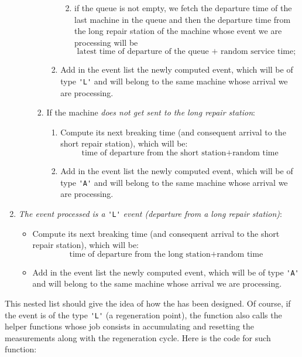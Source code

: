 \documentclass[12pt]{article}
\begin{document}
\begin{enumerate}[\circnum]
\begin{itemize}
\begin{enumerate}
\begin{enumerate}
\begin{enumerate}
\begin{equation*}
					\end{equation*}
					\item if the queue is not empty, we fetch the departure time of the last machine in the queue and then the departure time from the long repair station of the machine whose event we are processing will be
					\begin{equation*}
						\text{latest time of departure of the queue + random service time};
					\end{equation*}
				\end{enumerate}
				\item Add in the event list the newly computed event, which will be of type \verb*|'L'| and will belong to the same machine whose arrival we are processing.
			\end{enumerate}
			\item If the machine \textit{does not get sent to the long repair station}:
			\begin{enumerate}
				\item Compute its next breaking time (and consequent arrival to the short repair station), which will be:
				\begin{equation*}
					\text{time of departure from the short station+random time}
				\end{equation*}
				\item Add in the event list the newly computed event, which will be of type \verb*|'A'| and will belong to the same machine whose arrival we are processing.
			\end{enumerate}
		\end{enumerate}
	\end{itemize}
	\item \emph{The event processed is a }\verb*|'L'|\emph{ event (departure from a long repair station)}:
	\begin{itemize}
		\item Compute its next breaking time (and consequent arrival to the short repair station), which will be:
		\begin{equation*}
			\text{time of departure from the long station+random time}
		\end{equation*}
		\item Add in the event list the newly computed event, which will be of type \verb*|'A'| and will belong to the same machine whose arrival we are processing.
	\end{itemize}
\end{enumerate}
This nested list should give the idea of how the  has been designed. Of course, if the event is of the type \verb*|'L'| (a regeneration point), the function also calls the helper functions whose job consists in accumulating and resetting the measurements along with the regeneration cycle. Here is the code for such function:
\end{document}
